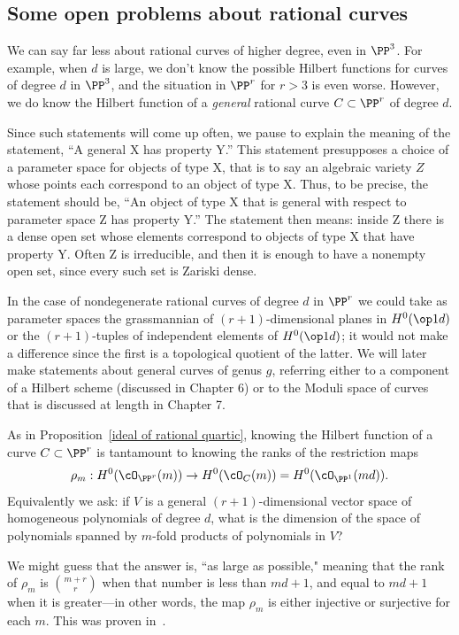 \subsection{Some open problems about rational curves}

We can say far less about rational curves of higher degree, even in $\PP^3$. For example, when $d$ is large, we
don't know the possible Hilbert functions for curves of degree $d$ in $\PP^3$, and the situation in $\PP^r$ for
$r>3$ is even worse. However, we do know the Hilbert function of a \emph{general} rational curve $C \subset \PP^r$ of degree $d$. 

Since such statements will come up often, we pause to explain the meaning of the statement, ``A general X has property Y.'' This statement presupposes a choice of a parameter space for objects of type X,
that is to say an algebraic variety $Z$ whose points each correspond to an object of type X. Thus, to be precise, the statement should be,
``An  object of type X that is general with respect to parameter space Z has property Y.'' The statement then means: inside Z there is
a dense open set whose elements correspond to objects of type X that have property Y. Often Z is irreducible, and
then it is enough to have a nonempty open set, since every such set is Zariski dense.

 In the case of nondegenerate rational curves
of degree $d$ in $\PP^{r}$ we could take as parameter spaces the grassmannian of $(r+1)$-dimensional planes in $H^{0}(\op1d)$ or the
$(r+1)$-tuples of independent elements of $H^{0}(\op1d)$; it would not make a difference since the first is a topological
quotient of the latter. We will later make statements about general curves of genus $g$, referring either to 
a component of a Hilbert scheme (discussed in Chapter 6) or to the
Moduli space of curves that is discussed at length in Chapter 7.

As in Proposition~\ref{ideal of rational quartic}, knowing the Hilbert function of a curve $C\subset \PP^{r}$ is tantamount to knowing the ranks of the restriction maps
$$
\rho_m : H^0(\cO_{\PP^r}(m)) \to H^0(\cO_C(m)) = H^0(\cO_{\PP^1}(md)).
$$
Equivalently we ask: if $V$ is a general  $(r+1)$-dimensional vector space of homogeneous polynomials of degree $d$, what is the dimension of the space of polynomials spanned by $m$-fold products of polynomials in $V$? 

We might guess that the answer is, ``as large as possible," meaning that the rank of $\rho_m$ is $\binom{m+r}{r}$ when that number is less than $md+1$, and equal to $md+1$ when it is greater---in other words, the map $\rho_m$ is either injective or surjective for each $m$. This was proven in~\cite{Ballico-Ellia83}.

